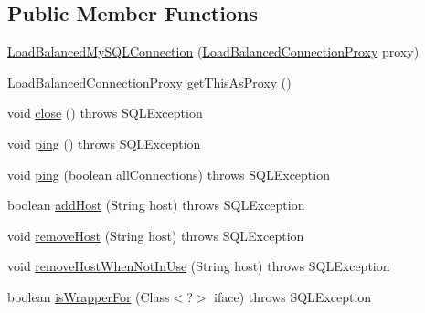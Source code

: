 \subsection*{Public Member Functions}
\begin{DoxyCompactItemize}
\item 
\mbox{\hyperlink{classcom_1_1mysql_1_1cj_1_1jdbc_1_1ha_1_1_load_balanced_my_s_q_l_connection_a818d820179932bd4115a4e8447b3fdec}{Load\+Balanced\+My\+S\+Q\+L\+Connection}} (\mbox{\hyperlink{classcom_1_1mysql_1_1cj_1_1jdbc_1_1ha_1_1_load_balanced_connection_proxy}{Load\+Balanced\+Connection\+Proxy}} proxy)
\item 
\mbox{\hyperlink{classcom_1_1mysql_1_1cj_1_1jdbc_1_1ha_1_1_load_balanced_connection_proxy}{Load\+Balanced\+Connection\+Proxy}} \mbox{\hyperlink{classcom_1_1mysql_1_1cj_1_1jdbc_1_1ha_1_1_load_balanced_my_s_q_l_connection_af9de092f120ef290b55055372dea8a1a}{get\+This\+As\+Proxy}} ()
\item 
void \mbox{\hyperlink{classcom_1_1mysql_1_1cj_1_1jdbc_1_1ha_1_1_load_balanced_my_s_q_l_connection_aa5aadbcc364a3ca64c27a08166914f8f}{close}} ()  throws S\+Q\+L\+Exception 
\item 
void \mbox{\hyperlink{classcom_1_1mysql_1_1cj_1_1jdbc_1_1ha_1_1_load_balanced_my_s_q_l_connection_a58a06fe0caa8144988fb2464d9fc4b0a}{ping}} ()  throws S\+Q\+L\+Exception 
\item 
void \mbox{\hyperlink{classcom_1_1mysql_1_1cj_1_1jdbc_1_1ha_1_1_load_balanced_my_s_q_l_connection_a62e8d4c1e4cea88eeb9b2c87d5f230c3}{ping}} (boolean all\+Connections)  throws S\+Q\+L\+Exception 
\item 
boolean \mbox{\hyperlink{classcom_1_1mysql_1_1cj_1_1jdbc_1_1ha_1_1_load_balanced_my_s_q_l_connection_affe5003f09c7d3e9fba41cf93dbe77ad}{add\+Host}} (String host)  throws S\+Q\+L\+Exception 
\item 
void \mbox{\hyperlink{classcom_1_1mysql_1_1cj_1_1jdbc_1_1ha_1_1_load_balanced_my_s_q_l_connection_aa6bab7fffe3955a425bbcf99174154c3}{remove\+Host}} (String host)  throws S\+Q\+L\+Exception 
\item 
void \mbox{\hyperlink{classcom_1_1mysql_1_1cj_1_1jdbc_1_1ha_1_1_load_balanced_my_s_q_l_connection_ad127c1ba70ff4bdba22ad3c70cd1ecff}{remove\+Host\+When\+Not\+In\+Use}} (String host)  throws S\+Q\+L\+Exception 
\item 
boolean \mbox{\hyperlink{classcom_1_1mysql_1_1cj_1_1jdbc_1_1ha_1_1_load_balanced_my_s_q_l_connection_a0a4d5ec928636709cb6aac4fd6f3c435}{is\+Wrapper\+For}} (Class$<$?$>$ iface)  throws S\+Q\+L\+Exception 
\end{DoxyCompactItemize}
